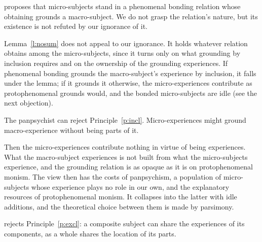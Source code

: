 \documentclass{situationist-preprint}
\begin{document}
\begin{objection}
\citet{Goff2017} proposes that micro-subjects stand in a phenomenal bonding relation whose obtaining grounds a macro-subject. We do not grasp the relation's nature, but its existence is not refuted by our ignorance of it.
\end{objection}

\begin{reply}
Lemma~\ref{l:nosum} does not appeal to our ignorance. It holds whatever relation obtains among the micro-subjects, since it turns only on what grounding by inclusion requires and on the ownership of the grounding experiences. If phenomenal bonding grounds the macro-subject's experience by inclusion, it falls under the lemma; if it grounds it otherwise, the micro-experiences contribute as protophenomenal grounds would, and the bonded micro-subjects are idle (see the next objection).
\end{reply}

\begin{objection}
The panpsychist can reject Principle~\ref{p:incl}. Micro-experiences might ground macro-experience without being parts of it.
\end{objection}

\begin{reply}
Then the micro-experiences contribute nothing in virtue of being experiences. What the macro-subject experiences is not built from what the micro-subjects experience, and the grounding relation is as opaque as it is on protophenomenal monism. The view then has the costs of panpsychism, a population of micro-subjects whose experience plays no role in our own, and the explanatory resources of protophenomenal monism. It collapses into the latter with idle additions, and the theoretical choice between them is made by parsimony.
\end{reply}

\begin{objection}
\citet{Roelofs2019} rejects Principle~\ref{p:excl}: a composite subject can share the experiences of its components, as a whole shares the location of its parts.
\end{objection}
\end{document}

